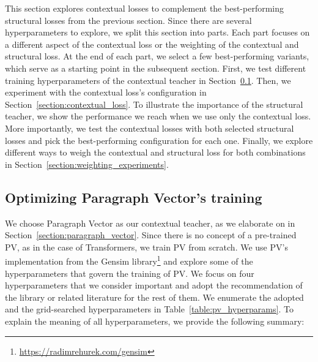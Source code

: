 This section explores contextual losses to complement the best-performing
structural losses from the previous section. Since there are several
hyperparameters to explore, we split this section into parts. Each part focuses
on a different aspect of the contextual loss or the weighting of the contextual
and structural loss. At the end of each part, we select a few best-performing
variants, which serve as a starting point in the subsequent section. First, we
test different training hyperparameters of the contextual teacher in
Section~\ref{section:pv_training}. Then, we experiment with the contextual
loss's configuration in Section~\ref{section:contextual_loss}. To illustrate
the importance of the structural teacher, we show the performance we reach when
we use only the contextual loss. More importantly, we test the contextual
losses with both selected structural losses and pick the best-performing configuration
for each one. Finally, we explore different ways to weigh the contextual and
structural loss for both combinations in
Section~\ref{section:weighting_experiments}.

\subsection{Optimizing Paragraph Vector's training}\label{section:pv_training}

We choose Paragraph Vector \citep{le2014distributed} as our contextual teacher,
as we elaborate on in Section~\ref{section:paragraph_vector}. Since there is no
concept of a pre-trained PV, as in the case of Transformers, we train PV from
scratch. We use PV's implementation from the Gensim
library\footnote{\label{fn:link_to_gensim}\url{https://radimrehurek.com/gensim}}
and explore some of the hyperparameters that govern the training of PV. We
focus on four hyperparameters that we consider important and adopt the
recommendation of the library or related literature for the rest of them. We enumerate the adopted
and the grid-searched hyperparameters in Table~\ref{table:pv_hyperparams}. To
explain the meaning of all hyperparameters, we provide the following summary:


